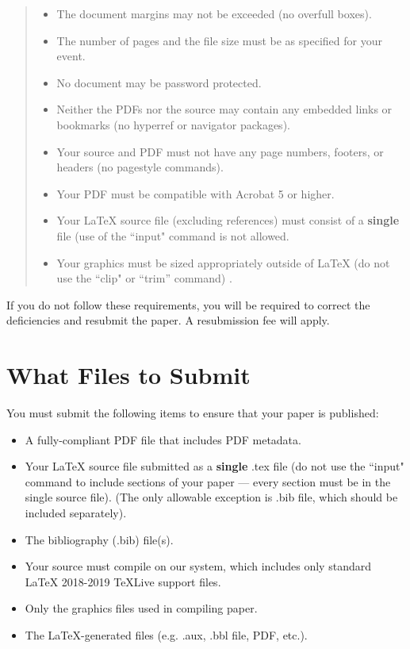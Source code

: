 \documentclass[letterpaper]{article} %
\begin{document}
\begin{quote}
\begin{itemize}
\item The document margins may not be exceeded (no overfull boxes).
\item The number of pages and the file size must be as specified for your event.
\item No document may be password protected.
\item Neither the PDFs nor the source may contain any embedded links or bookmarks (no hyperref or navigator packages).
\item Your source and PDF must not have any page numbers, footers, or headers (no pagestyle commands).
\item Your PDF must be compatible with Acrobat 5 or higher.
\item Your \LaTeX{} source file (excluding references) must consist of a \textbf{single} file (use of the ``input" command is not allowed.
\item Your graphics must be sized appropriately outside of \LaTeX{} (do not use the ``clip" or ``trim'' command) .
\end{itemize}
\end{quote}

If you do not follow these requirements, you will be required to correct the deficiencies and resubmit the paper. A resubmission fee will apply.

\section{What Files to Submit}
You must submit the following items to ensure that your paper is published:
\begin{itemize}
\item A fully-compliant PDF file that includes PDF metadata.
\item Your \LaTeX{} source file submitted as a \textbf{single} .tex file (do not use the ``input" command to include sections of your paper --- every section must be in the single source file). (The only allowable exception is .bib file, which should be included separately). 
\item The bibliography (.bib) file(s).
\item Your source must compile on our system, which includes only standard \LaTeX{} 2018-2019 TeXLive support files. 
\item Only the graphics files used in compiling paper.
\item The \LaTeX{}-generated files (e.g. .aux,  .bbl file, PDF, etc.).
\end{itemize}
\end{document}
